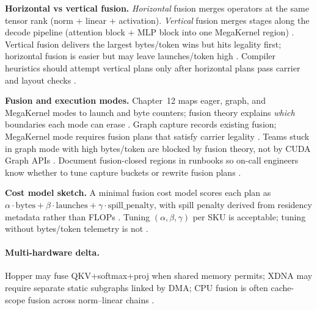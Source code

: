 \textbf{Horizontal vs vertical fusion.} \emph{Horizontal} fusion merges operators at the same tensor rank (norm + linear + activation). \emph{Vertical} fusion merges stages along the decode pipeline (attention block + MLP block into one MegaKernel region) \citep{yirage2026,dao2022flashattention,taxbreak2026}. Vertical fusion delivers the largest bytes/token wins but hits legality first; horizontal fusion is easier but may leave launches/token high \citep{taxbreak2026,nvidia2024cudagraphs,patel2025llminference}. Compiler heuristics should attempt vertical plans only after horizontal plans pass carrier and layout checks \citep{yirage2026,chen2020compilerbasedhardw,semianalysis2024tma}.

\textbf{Fusion and execution modes.} Chapter~12 maps eager, graph, and MegaKernel modes to launch and byte counters; fusion theory explains \emph{which} boundaries each mode can erase \citep{nvidia2024cudagraphs,yirage2026,memoryfloor2026,taxbreak2026,patel2025llminference}. Graph capture records existing fusion; MegaKernel mode requires fusion plans that satisfy carrier legality \citep{dao2022flashattention,dao2023flashdecoding,yirage2026,chen2020compilerbasedhardw,semianalysis2024tma,nvidia2022hopper,amd2024aie,amd2024xdna,dlbook,kwon2023vllm,liu2024deepseekv3}. Teams stuck in graph mode with high bytes/token are blocked by fusion theory, not by CUDA Graph APIs \citep{memoryfloor2026,taxbreak2026,nvidia2024cudagraphs,patel2025llminference,yirage2026,chen2020compilerbasedhardw,dao2022flashattention,semianalysis2024tma,dlbook}. Document fusion-closed regions in runbooks so on-call engineers know whether to tune capture buckets or rewrite fusion plans \citep{yirage2026,chen2020compilerbasedhardw,patel2025llminference,taxbreak2026,memoryfloor2026,nvidia2024cudagraphs,amd2024xdna,amd2024aie,dlbook,kwon2023vllm,liu2024deepseekv3,dao2022flashattention,dao2023flashdecoding,nvidia2022hopper,semianalysis2024tma}.

\textbf{Cost model sketch.} A minimal fusion cost model scores each plan as $\alpha \cdot \mathrm{bytes} + \beta \cdot \mathrm{launches} + \gamma \cdot \mathrm{spill\_penalty}$, with spill penalty derived from residency metadata rather than FLOPs \citep{memoryfloor2026,taxbreak2026,patel2025llminference,yirage2026}. Tuning $(\alpha,\beta,\gamma)$ per SKU is acceptable; tuning without bytes/token telemetry is not \citep{semianalysis2024tma,dlbook}.

\paragraph{Multi-hardware delta.} Hopper may fuse QKV+softmax+proj when shared memory permits; XDNA may require separate static subgraphs linked by DMA; CPU fusion is often cache-scope fusion across norm--linear chains \citep{nvidia2022hopper,amd2024xdna,dlbook,chen2020compilerbasedhardw,kwon2023vllm}.

